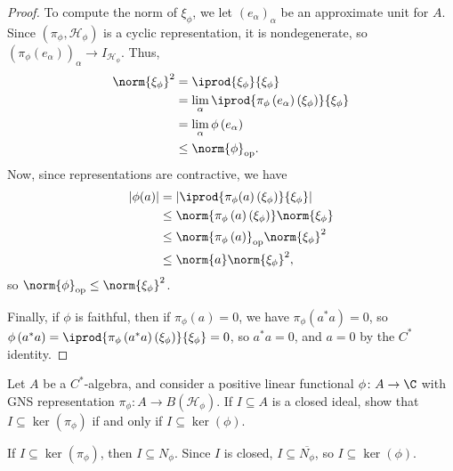 \documentclass[10pt]{mypackage}
\DeclareMathOperator{\op}{op}
\begin{document}
\begin{proof}
  To compute the norm of $\xi_{\phi}$, we let $\left(e_{\alpha}\right)_{\alpha}$ be an approximate unit for $A$. Since $\left(\pi_{\phi},\mathcal{H}_{\phi}\right)$ is a cyclic representation, it is nondegenerate, so $\left(\pi_{\phi}\left(e_{\alpha}\right)\right)_{\alpha}\rightarrow I_{\mathcal{H}_{\phi}}$. Thus,
  \begin{align*}
    \norm{\xi_{\phi}}^2 &= \iprod{\xi_{\phi}}{\xi_{\phi}}\\
                        &= \lim_{\alpha} \iprod{\pi_{\phi}\left(e_{\alpha}\right)\left(\xi_{\phi}\right)}{\xi_{\phi}}\\
                        &= \lim_{\alpha}\phi\left(e_{\alpha}\right)\\
                        &\leq \norm{\phi}_{\op}.
  \end{align*}
  Now, since representations are contractive, we have
  \begin{align*}
    \left\vert \phi(a) \right\vert &= \left\vert \iprod{\pi_{\phi}(a)\left(\xi_{\phi}\right)}{\xi_{\phi}} \right\vert\\
                                   &\leq \norm{\pi_{\phi}\left(a\right)\left(\xi_{\phi}\right)} \norm{\xi_{\phi}}\\
                                   &\leq \norm{\pi_{\phi}\left(a\right)}_{\op}\norm{\xi_{\phi}}^2\\
                                   &\leq \norm{a}\norm{\xi_{\phi}}^2,
  \end{align*}
  so $\norm{\phi}_{\op}\leq \norm{\xi_{\phi}}^2$.\newline

  Finally, if $\phi$ is faithful, then if $\pi_{\phi}(a) = 0$, we have $\pi_{\phi}\left(a^{\ast}a\right) = 0$, so $\phi\left(a^{\ast}a\right)  = \iprod{\pi_{\phi}\left(a^{\ast}a\right)\left(\xi_{\phi}\right)}{\xi_{\phi}} = 0$, so $a^{\ast}a = 0$, and $a = 0$ by the $C^{\ast}$ identity.
\end{proof}
\begin{exercise}
  Let $A$ be a $C^{\ast}$-algebra, and consider a positive linear functional $\phi\colon A\rightarrow \C$ with GNS representation $\pi_{\phi}\colon A\rightarrow B\left(\mathcal{H}_{\phi}\right)$. If $I\subseteq A$ is a closed ideal, show that $I\subseteq \ker\left(\pi_{\phi}\right)$ if and only if $I\subseteq \ker\left(\phi\right)$.
\end{exercise}
\begin{solution}
  If $I\subseteq \ker\left(\pi_{\phi}\right)$, then $I\subseteq N_{\phi}$. Since $I$ is closed, $I\subseteq \overline{N_{\phi}}$, so $I\subseteq \ker\left(\phi\right)$.
\end{solution}
\end{document}
